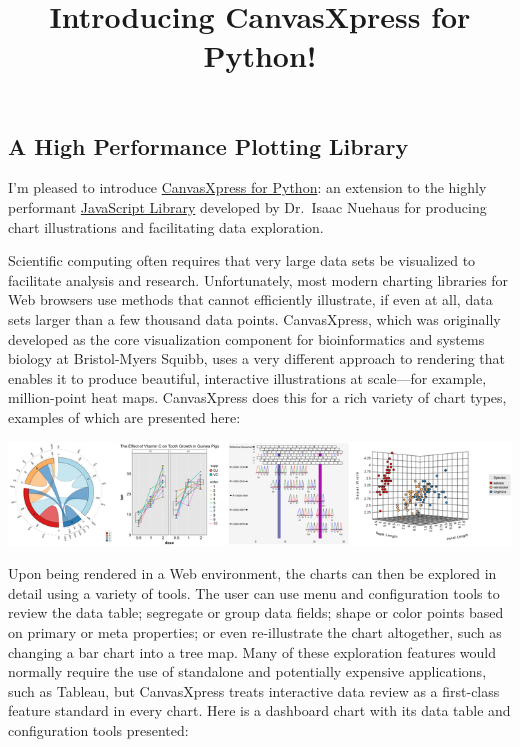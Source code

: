 \documentclass[
  letterpaper,
  DIV=11,
  numbers=noendperiod]{scrartcl}
\title{Introducing CanvasXpress for Python!}
\author{}
\date{}
\begin{document}
\maketitle
\ifdefined\Shaded\renewenvironment{Shaded}{\begin{tcolorbox}[sharp corners, breakable, interior hidden, frame hidden, borderline west={3pt}{0pt}{shadecolor}, boxrule=0pt, enhanced]}{\end{tcolorbox}}\fi

\hypertarget{a-high-performance-plotting-library}{%
\subsection{A High Performance Plotting
Library}\label{a-high-performance-plotting-library}}

I'm pleased to introduce
\href{https://pypi.org/project/canvasxpress/}{CanvasXpress for Python}:
an extension to the highly performant
\href{https://canvasxpress.org}{JavaScript Library} developed by
Dr.~Isaac Nuehaus for producing chart illustrations and facilitating
data exploration.

Scientific computing often requires that very large data sets be
visualized to facilitate analysis and research. Unfortunately, most
modern charting libraries for Web browsers use methods that cannot
efficiently illustrate, if even at all, data sets larger than a few
thousand data points. CanvasXpress, which was originally developed as
the core visualization component for bioinformatics and systems biology
at Bristol-Myers Squibb, uses a very different approach to rendering
that enables it to produce beautiful, interactive illustrations at
scale---for example, million-point heat maps. CanvasXpress does this for
a rich variety of chart types, examples of which are presented here:

\includegraphics{sample_graphs.png}

Upon being rendered in a Web environment, the charts can then be
explored in detail using a variety of tools. The user can use menu and
configuration tools to review the data table; segregate or group data
fields; shape or color points based on primary or meta properties; or
even re-illustrate the chart altogether, such as changing a bar chart
into a tree map. Many of these exploration features would normally
require the use of standalone and potentially expensive applications,
such as Tableau, but CanvasXpress treats interactive data review as a
first-class feature standard in every chart. Here is a dashboard chart
with its data table and configuration tools presented:
\end{document}
